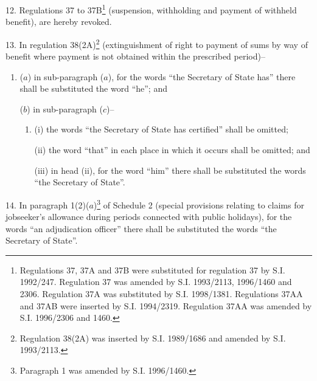 \documentclass[12pt,a4paper]{article}
\begin{document}
\medskip

12.  Regulations 37 to 37B\footnote{\frenchspacing Regulations 37, 37A and 37B were substituted for regulation 37 by S.I. 1992/247. Regulation 37 was amended by S.I. 1993/2113, 1996/1460 and 2306. Regulation 37A was substituted by S.I. 1998/1381. Regulations 37AA and 37AB were inserted by S.I. 1994/2319. Regulation 37AA was amended by S.I. 1996/2306 and 1460.} (suspension, withholding and payment of withheld benefit), are hereby revoked.

\medskip

13.  In regulation 38(2A)\footnote{\frenchspacing Regulation 38(2A) was inserted by S.I. 1989/1686 and amended by S.I. 1993/2113.} (extinguishment of right to payment of sums by way of benefit where payment is not obtained within the prescribed period)–
\begin{enumerate}\item[]
($a$) in sub-paragraph ($a$), for the words “the Secretary of State has” there shall be substituted the word “he”; and

($b$) in sub-paragraph ($c$)–
\begin{enumerate}\item[]
(i) the words “the Secretary of State has certified” shall be omitted;

(ii) the word “that” in each place in which it occurs shall be omitted; and

(iii) in head (ii), for the word “him” there shall be substituted the words “the Secretary of State”.
\end{enumerate}
\end{enumerate}

\medskip

14.  In paragraph 1(2)($a$)\footnote{\frenchspacing Paragraph 1 was amended by S.I. 1996/1460.} of Schedule 2 (special provisions relating to claims for jobseeker’s allowance during periods connected with public holidays), for the words “an adjudication officer” there shall be substituted the words “the Secretary of State”.

\medskip
\end{document}

